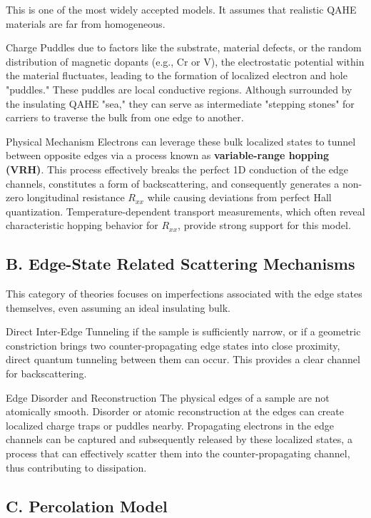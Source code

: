 \documentclass[aps,prl,reprint,groupedaddress]{revtex4-2}
\begin{document}
This is one of the most widely accepted models. It assumes that realistic QAHE materials are far from homogeneous.

Charge Puddles due to factors like the substrate, material defects, or the random distribution of magnetic dopants (e.g., Cr or V), the electrostatic potential within the material fluctuates, leading to the formation of localized electron and hole "puddles." These puddles are local conductive regions. Although surrounded by the insulating QAHE "sea," they can serve as intermediate "stepping stones" for carriers to traverse the bulk from one edge to another.

Physical Mechanism Electrons can leverage these bulk localized states to tunnel between opposite edges via a process known as \textbf{variable-range hopping (VRH)}. This process effectively breaks the perfect 1D conduction of the edge channels, constitutes a form of backscattering, and consequently generates a non-zero longitudinal resistance $R_{xx}$ while causing deviations from perfect Hall quantization. Temperature-dependent transport measurements, which often reveal characteristic hopping behavior for $R_{xx}$, provide strong support for this model.

\subsection{B. Edge-State Related Scattering Mechanisms}

This category of theories focuses on imperfections associated with the edge states themselves, even assuming an ideal insulating bulk.

Direct Inter-Edge Tunneling if the sample is sufficiently narrow, or if a geometric constriction brings two counter-propagating edge states into close proximity, direct quantum tunneling between them can occur. This provides a clear channel for backscattering.

Edge Disorder and Reconstruction The physical edges of a sample are not atomically smooth. Disorder or atomic reconstruction at the edges can create localized charge traps or puddles nearby. Propagating electrons in the edge channels can be captured and subsequently released by these localized states, a process that can effectively scatter them into the counter-propagating channel, thus contributing to dissipation.

\subsection{C. Percolation Model}
\end{document}
